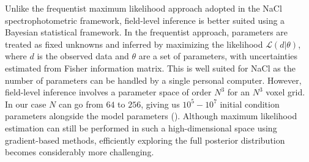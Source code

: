 Unlike the frequentist maximum likelihood approach adopted in the NaCl spectrophotometric framework, field-level inference is better suited using a Bayesian 
statistical framework. In the frequentist approach, parameters are treated as fixed unknowns and inferred by maximizing the likelihood 
$\mathcal{L}(d|\theta)$, where $d$ is the observed data and $\theta$ are a set of parameters, 
with uncertainties estimated from Fisher information matrix. This is well suited for NaCl as the number of parameters can be handled by a single personal computer. 
However, field-level inference involves a parameter space of order $N^3$ for an $N^3$ voxel 
grid. In our case $N$ can go from $64$ to $256$, giving us $10^5 - 10^7$ initial condition parameters alongside the model parameters (\cite{Jasche_2019,Mcalpine_2025}). 
Although maximum likelihood estimation can still be performed in such a high-dimensional space using gradient-based methods, 
efficiently exploring the full posterior distribution becomes considerably more challenging. 


